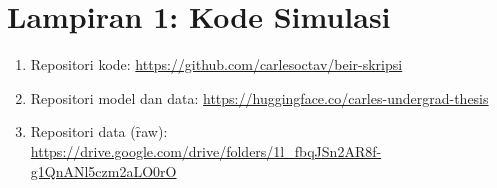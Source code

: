 \chapter*{Lampiran 1: Kode Simulasi}
\begin{enumerate}
    \item Repositori kode: \url{https://github.com/carlesoctav/beir-skripsi} 
    \item Repositori model dan data: \url{https://huggingface.co/carles-undergrad-thesis}
    \item Repositori data (\f{raw}): \url{https://drive.google.com/drive/folders/1l_fbqJSn2AR8f-g1QnANl5czm2aLO0rO}
\end{enumerate}



\newpage



\newpage



\newpage



\newpage

 

\newpage



\newpage






